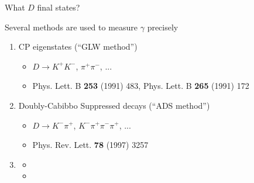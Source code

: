 \documentclass[dvipsnames]{beamer}
\begin{document}
\begin{frame}{What $D$ final states?}
  \begin{center}
    \Large Several methods are used to measure $\gamma$ precisely
  \end{center}
  \vspace{0.2cm}
  \begin{enumerate}
    \setlength\itemsep{1.0em}
    \item{CP eigenstates (``GLW method'')}
    \begin{itemize}
      \item{$D\to K^+K^-$, $\pi^+\pi^-$, ...}
      \item{Phys. Lett. B \textbf{253} (1991) 483, Phys. Lett. B \textbf{265} (1991) 172}
    \end{itemize}
    \item{Doubly-Cabibbo Suppressed decays (``ADS method'')}
    \begin{itemize}
      \item{$D\to K^-\pi^+$, $K^-\pi^+\pi^-\pi^+$, ...}
      \item{Phys. Rev. Lett. \textbf{78} (1997) 3257}
    \end{itemize}
    \item[]{\phantom{Self-conjugate multi-body final states (``BPGGSZ method'')}}
    \begin{itemize}
      \item[]{\phantom{$D\to K_S^0\pi^+\pi^-$, $K_S^0K^+K^-$, ...}}
      \item[]{}
    \end{itemize}
  \end{enumerate}
\end{frame}
\end{document}
